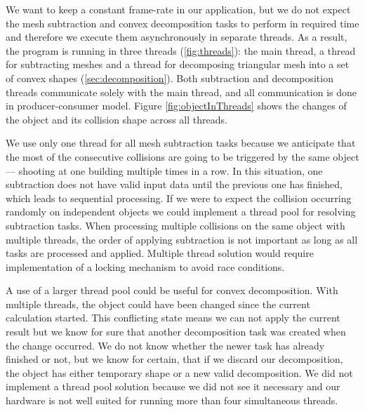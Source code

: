 We want to keep a constant frame-rate in our application, but we do not  expect the mesh subtraction and convex decomposition tasks to perform in required time and therefore we execute them asynchronously in separate threads. As a result, the program is running in three threads (\cref{fig:threads}): the main thread, a thread for subtracting meshes and a thread for decomposing triangular mesh into a set of convex shapes (\cref{sec:decomposition}). Both subtraction and decomposition threads communicate solely with the main thread, and all communication is done in producer-consumer model. Figure \ref{fig:objectInThreads} shows the changes of the object and its collision shape across all threads.

We use only one thread for all mesh subtraction tasks because we anticipate that the most of the consecutive collisions are going to be triggered by the same object --- shooting at one building multiple times in a row. In this situation, one subtraction does not have valid input data until the previous one has finished, which leads to sequential processing. If we were to expect the collision occurring randomly on independent objects we could implement a thread pool for resolving subtraction tasks. When processing multiple collisions on the same object with multiple threads, the order of applying subtraction is not important as long as all tasks are processed and applied. Multiple thread solution would require implementation of a locking mechanism to avoid race conditions.

A use of a larger thread pool could be useful for convex decomposition. With multiple threads, the object could have been changed since the current calculation started. This conflicting state means we can not apply the current result but we know for sure that another decomposition task was created when the change occurred. We do not know whether the newer task has already finished or not, but we know for certain, that if we discard our decomposition, the object has either temporary shape or a new valid decomposition. We did not implement a thread pool solution because we did not see it necessary and our hardware  is not well suited for running more than four simultaneous threads.

